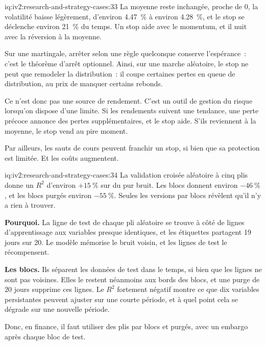 \begin{solution}{iq:iv2:research-and-strategy-cases:33}
La moyenne reste inchangée, proche de 0, la volatilité baisse légèrement, d'environ 4.47~\% à environ 4.28~\%, et le stop se déclenche environ 21~\% du temps. Un stop aide avec le momentum, et il nuit avec la réversion à la moyenne.

Sur une martingale, arrêter selon une règle quelconque conserve l'espérance~: c'est le théorème d'arrêt optionnel. Ainsi, sur une marche aléatoire, le stop ne peut que remodeler la distribution~: il coupe certaines pertes en queue de distribution, au prix de manquer certains rebonds.

Ce n'est donc pas une source de rendement. C'est un outil de gestion du risque lorsqu'on dispose d'une limite. Si les rendements suivent une tendance, une perte précoce annonce des pertes supplémentaires, et le stop aide. S'ils reviennent à la moyenne, le stop vend au pire moment.

Par ailleurs, les sauts de cours peuvent franchir un stop, si bien que sa protection est limitée. Et les coûts augmentent.

\end{solution}

\begin{solution}{iq:iv2:research-and-strategy-cases:34}
La validation croisée aléatoire à cinq plis donne un $R^2$ d'environ $+15~\%$ sur du pur bruit. Les blocs donnent environ $-46~\%$, et les blocs purgés environ $-55~\%$. Seules les versions par blocs révèlent qu'il n'y a rien à trouver.

\textbf{Pourquoi.} La ligne de test de chaque pli aléatoire se trouve à côté de lignes d'apprentissage aux variables presque identiques, et les étiquettes partagent 19 jours sur 20. Le modèle mémorise le bruit voisin, et les lignes de test le récompensent.

\textbf{Les blocs.} Ils séparent les données de test dans le temps, si bien que les lignes ne sont pas voisines. Elles le restent néanmoins aux bords des blocs, et une purge de 20 jours supprime ces lignes. Le $R^2$ fortement négatif montre ce que dix variables persistantes peuvent ajuster sur une courte période, et à quel point cela se dégrade sur une nouvelle période.

Donc, en finance, il faut utiliser des plis par blocs et purgés, avec un embargo après chaque bloc de test.

\end{solution}

